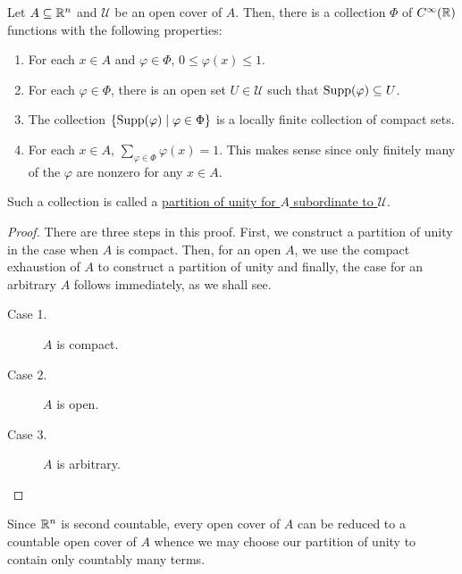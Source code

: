 \begin{theorem}
    Let $A\subseteq\mathbb{R}^n$ and $\mathscr U$ be an open cover of $A$. Then, there is a collection $\Phi$ of $C^\infty(\mathbb{R})$ functions with the following properties: 
    \begin{enumerate}[label=(\alph*)]
        \item For each $x\in A$ and $\varphi\in\Phi$, $0\le\varphi(x)\le 1$. 
        \item For each $\varphi\in\Phi$, there is an open set $U\in\mathscr U$ such that $\operatorname{Supp}(\varphi)\subseteq U$.
        \item The collection $\{\operatorname{Supp}(\varphi)\mid \varphi\in\Phi\}$ is a locally finite collection of compact sets.
        \item For each $x\in A$, $\sum_{\varphi\in\Phi}\varphi(x) = 1$. This makes sense since only finitely many of the $\varphi$ are nonzero for any $x\in A$.
    \end{enumerate}
    Such a collection is called a \underline{partition of unity for $A$ subordinate to $\mathscr U$}.
\end{theorem}
\begin{proof}
There are three steps in this proof. First, we construct a partition of unity in the case when $A$ is compact. Then, for an open $A$, we use the compact exhaustion of $A$ to construct a partition of unity and finally, the case for an arbitrary $A$ follows immediately, as we shall see.
\begin{description}
    \item[Case 1.]  $A$ is compact. 
    

    \item[Case 2.] $A$ is open.

    \item[Case 3.] $A$ is arbitrary.
    \qedhere
\end{description}
\end{proof}

\begin{remark}
Since $\mathbb{R}^n$ is second countable, every open cover of $A$ can be reduced to a countable open cover of $A$ whence we may choose our partition of unity to contain only countably many terms.
\end{remark}

